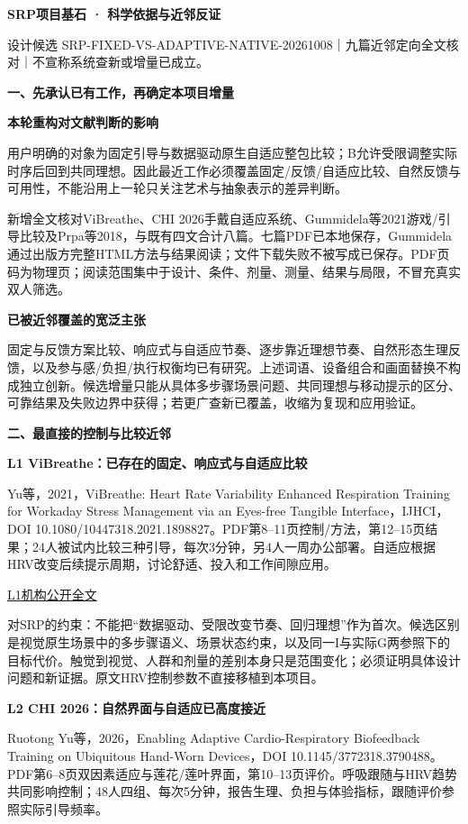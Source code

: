 \documentclass[11pt,a4paper]{article}
\newcommand{\reviewtitle}[1]{\begin{center}{\titlelatin\titlecjk\bfseries\fontsize{21}{28}\selectfont #1}\end{center}\vspace{8pt}}
\newcommand{\reviewsection}[1]{\par\Needspace{9\baselineskip}\vspace{10pt}\begin{center}{\titlelatin\titlecjk\bfseries\fontsize{14}{20}\selectfont #1}\end{center}}
\newcommand{\reviewsubsection}[1]{\par\Needspace{4\baselineskip}\vspace{4pt}\begin{center}{\titlelatin\titlecjk\bfseries\fontsize{12}{18}\selectfont #1}\end{center}}
\begin{document}
\reviewtitle{SRP项目基石 · 科学依据与近邻反证}
设计候选 SRP-\allowbreak{}FIXED-\allowbreak{}VS-\allowbreak{}ADAPTIVE-\allowbreak{}NATIVE-\allowbreak{}20261008｜九篇近邻定向全文核对｜不宣称系统查新或增量已成立。


\reviewsection{一、先承认已有工作，再确定本项目增量}
\reviewsubsection{1.1 本轮重构对文献判断的影响}
用户明确的对象为固定引导与数据驱动原生自适应整包比较；B允许受限调整实际时序后回到共同理想。因此最近工作必须覆盖固定/\allowbreak{}反馈/\allowbreak{}自适应比较、自然反馈与可用性，不能沿用上一轮只关注艺术与抽象表示的差异判断。


新增全文核对ViBreathe、CHI 2026手戴自适应系统、Gummidela等2021游戏/\allowbreak{}引导比较及Prpa等2018，与既有四文合计八篇。七篇PDF已本地保存，Gummidela通过出版方完整HTML方法与结果阅读；文件下载失败不被写成已保存。PDF页码为物理页；阅读范围集中于设计、条件、剂量、测量、结果与局限，不冒充真实双人筛选。


\reviewsubsection{1.2 已被近邻覆盖的宽泛主张}
固定与反馈方案比较、响应式与自适应节奏、逐步靠近理想节奏、自然形态生理反馈，以及参与感/\allowbreak{}负担/\allowbreak{}执行权衡均已有研究。上述词语、设备组合和画面替换不构成独立创新。候选增量只能从具体多步骤场景问题、共同理想与移动提示的区分、可靠结果及失败边界中获得；若更广查新已覆盖，收缩为复现和应用验证。


\reviewsection{二、最直接的控制与比较近邻}
\reviewsubsection{2.1 L1 ViBreathe：已存在的固定、响应式与自适应比较}
Yu等，2021，ViBreathe: Heart Rate Variability Enhanced Respiration Training for Workaday Stress Management via an Eyes-\allowbreak{}free Tangible Interface，IJHCI，DOI 10.1080/\allowbreak{}10447318.2021.1898827。PDF第8–11页控制/\allowbreak{}方法，第12–15页结果；24人被试内比较三种引导，每次3分钟，另4人一周办公部署。自适应根据HRV改变后续提示周期，讨论舒适、投入和工作间隙应用。


\href{https://research.chalmers.se/publication/523202/file/523202_Fulltext.pdf}{L1机构公开全文}


对SRP的约束：不能把“数据驱动、受限改变节奏、回归理想”作为首次。候选区别是视觉原生场景中的多步骤语义、场景状态约束，以及同一I与实际G两参照下的目标代价。触觉到视觉、人群和剂量的差别本身只是范围变化；必须证明具体设计问题和新证据。原文HRV控制参数不直接移植到本项目。


\reviewsubsection{2.2 L2 CHI 2026：自然界面与自适应已高度接近}
Ruotong Yu等，2026，Enabling Adaptive Cardio-\allowbreak{}Respiratory Biofeedback Training on Ubiquitous Hand-\allowbreak{}Worn Devices，DOI 10.1145/\allowbreak{}3772318.3790488。PDF第6–8页双因素适应与莲花/\allowbreak{}莲叶界面，第10–13页评价。呼吸跟随与HRV趋势共同影响控制；48人四组、每次5分钟，报告生理、负担与体验指标，跟随评价参照实际引导频率。
\end{document}
